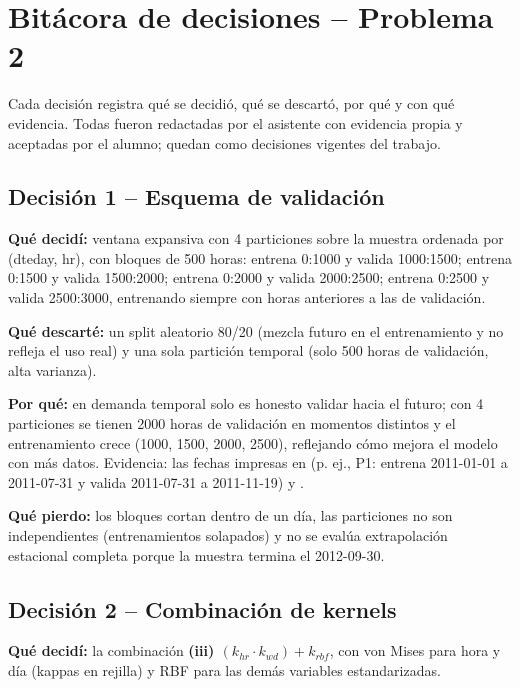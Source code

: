 \section*{Bitácora de decisiones -- Problema 2}

Cada decisión registra qué se decidió, qué se descartó, por qué y con qué
evidencia. Todas fueron redactadas por el asistente con evidencia propia y
aceptadas por el alumno; quedan como decisiones vigentes del trabajo.

\subsection*{Decisión 1 -- Esquema de validación}

\textbf{Qué decidí:} ventana expansiva con 4 particiones sobre la muestra
ordenada por (dteday, hr), con bloques de 500 horas: entrena 0:1000 y valida
1000:1500; entrena 0:1500 y valida 1500:2000; entrena 0:2000 y valida
2000:2500; entrena 0:2500 y valida 2500:3000, entrenando siempre con horas
anteriores a las de validación.

\textbf{Qué descarté:} un split aleatorio 80/20 (mezcla futuro en el
entrenamiento y no refleja el uso real) y una sola partición temporal (solo
500 horas de validación, alta varianza).

\textbf{Por qué:} en demanda temporal solo es honesto validar hacia el
futuro; con 4 particiones se tienen 2000 horas de validación en momentos
distintos y el entrenamiento crece (1000, 1500, 2000, 2500), reflejando cómo
mejora el modelo con más datos. Evidencia: las fechas impresas en
 (p. ej., P1: entrena 2011-01-01 a 2011-07-31 y
valida 2011-07-31 a 2011-11-19) y .

\textbf{Qué pierdo:} los bloques cortan dentro de un día, las particiones no
son independientes (entrenamientos solapados) y no se evalúa extrapolación
estacional completa porque la muestra termina el 2012-09-30.

\subsection*{Decisión 2 -- Combinación de kernels}

\textbf{Qué decidí:} la combinación \textbf{(iii) $(k_{hr}\cdot k_{wd})+k_{rbf}$},
con von Mises para hora y día (kappas en rejilla) y RBF para las demás
variables estandarizadas.

